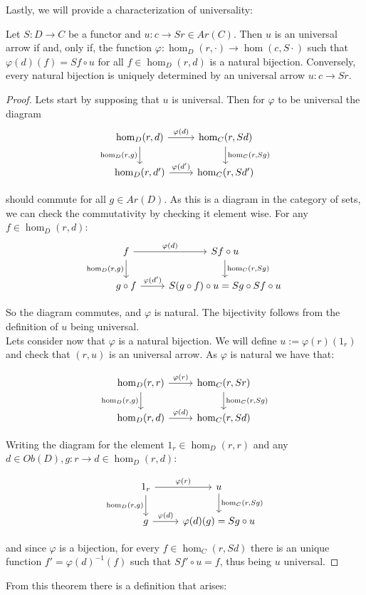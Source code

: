   Lastly, we will provide a characterization of universality:
  \begin{proposition}
      Let $S: D \to C$ be a functor and $u:c\to Sr\in Ar(C)$. Then $u$ is an universal arrow if and, only if, the function $\varphi:\hom_D(r,\cdot)\to \hom(c,S\cdot)$ such that $\varphi(d)(f)= Sf\circ u$ for all $f\in \hom_D(r,d)$ is a natural bijection. Conversely, every natural bijection is uniquely determined by an universal arrow $u:c\to Sr$. 
  \end{proposition}
  \begin{proof}
    Lets start by supposing that $u$ is universal. Then for $\varphi$ to be universal the diagram 
    \[
      \begin{tikzcd}
        \hom_D(r,d)\arrow[swap]{d}{\hom_D(r,g)}\arrow{r}{\varphi(d)} & \hom_C(r,Sd)\arrow{d}{\hom_C(r,Sg)}\\
        \hom_D(r,d')\arrow{r}{\varphi(d')} & \hom_C(r,Sd')
      \end{tikzcd}
    \]

    should commute for all $g\in Ar(D)$. As this is a diagram in the category of sets, we can check the commutativity by checking it element wise. For any $f \in\hom_D(r,d)$:
    \[
      \begin{tikzcd}
        f\arrow[swap]{d}{\hom_D(r,g)}\arrow{r}{\varphi(d)} & Sf\circ u \arrow{d}{\hom_C(r,Sg)}\\
        g\circ f \arrow{r}{\varphi(d')} & S(g\circ f) \circ u = Sg\circ Sf \circ u
      \end{tikzcd}
    \]

    So the diagram commutes, and $\varphi$ is natural. The bijectivity follows from the definition of $u$ being universal.\\

    Lets consider now that $\varphi$ is a natural bijection. We will define $u := \varphi(r)(1_r)$ and check that $(r,u)$ is an universal arrow. As $\varphi$ is natural we have that:

    \[
      \begin{tikzcd}
        \hom_D(r,r)\arrow[swap]{d}{\hom_D(r,g)}\arrow{r}{\varphi(r)} & \hom_C(r,Sr)\arrow{d}{\hom_C(r,Sg)}\\
        \hom_D(r,d)\arrow{r}{\varphi(d)} & \hom_C(r,Sd)
      \end{tikzcd}
    \]

    Writing the diagram for the element $1_r\in\hom_D(r,r)$ and any $d\in Ob(D), g:r\to d\in \hom_D(r,d)$:

    \[
      \begin{tikzcd}
        1_r \arrow[swap]{d}{\hom_D(r,g)}\arrow{r}{\varphi(r)} & u \arrow{d}{\hom_C(r,Sg)}\\
        g\arrow{r}{\varphi(d)} & \varphi(d)(g)= Sg\circ u
      \end{tikzcd}
    \]

    and since $\varphi$ is a bijection, for every $f\in \hom_C(r,Sd)$ there is an unique function $f' = \varphi(d)^{-1}(f)$ such that $Sf'\circ u = f$, thus being $u$ universal.

\end{proof}
From this theorem there is a definition that arises:

